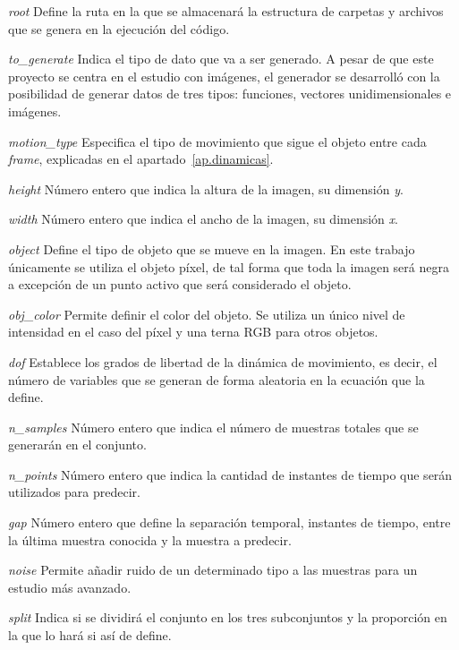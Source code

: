 \begin{basedescript}{\desclabelstyle{\pushlabel}\desclabelwidth{2.75cm}}
\item[\textit{root}] Define la ruta en la que se almacenará la estructura de carpetas y archivos que se genera en la ejecución del código.
\item[\textit{to\_generate}] Indica el tipo de dato que va a ser generado. A pesar de que este proyecto se centra en el estudio con imágenes, el generador se desarrolló con la posibilidad de generar datos de tres tipos: funciones, vectores unidimensionales e imágenes.
\item[\textit{motion\_type}] Especifica el tipo de movimiento que sigue el objeto entre cada \textit{frame}, explicadas en el apartado~\ref{ap.dinamicas}.
\item[\textit{height}]  Número entero que indica la altura de la imagen, su dimensión \textit{y}.
\item[\textit{width}]  Número entero que indica el ancho de la imagen, su dimensión \textit{x}.
\item[\textit{object}]  Define el tipo de objeto que se mueve en la imagen. En este trabajo únicamente se utiliza el objeto píxel, de tal forma que toda la imagen será negra a excepción de un punto activo que será considerado el objeto.
\item[\textit{obj\_color}]  Permite definir el color del objeto. Se utiliza un único nivel de intensidad en el caso del píxel y una terna RGB para otros objetos.
\item[\textit{dof}] Establece los grados de libertad de la dinámica de movimiento, es decir, el número de variables que se generan de forma aleatoria en la ecuación que la define.
\item[\textit{n\_samples}]  Número entero que indica el número de muestras totales que se generarán en el conjunto.
\item[\textit{n\_points}] Número entero que indica la cantidad de instantes de tiempo que serán utilizados para predecir.
\item[\textit{gap}] Número entero que define la separación temporal, instantes de tiempo, entre la última muestra conocida y la muestra a predecir.
\item[\textit{noise}] Permite añadir ruido de un determinado tipo a las muestras para un estudio más avanzado.
\item[\textit{split}] Indica si se dividirá el conjunto en los tres subconjuntos y la proporción en la que lo hará si así de define.
\end{basedescript}

